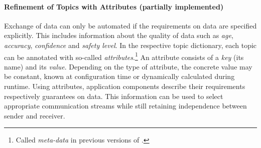\paragraph{Refinement of Topics with Attributes (partially implemented)}
Exchange of data can only be automated if the requirements on data are specified explicitly.
This includes information about the quality of data such as \emph{age}, \emph{accuracy}, \emph{confidence} and \emph{safety level}.
In the respective topic dictionary, each topic can be annotated with so-called \emph{attributes}.\footnote{Called \emph{meta-data} in previous versions of \xme.}
An attribute consists of a \emph{key} (its name) and its \emph{value}.
Depending on the type of attribute, the concrete value may be constant, known at configuration time or dynamically calculated during runtime.
%
Using attributes, application components describe their requirements respectively guarantees on data.
This information can be used to select appropriate communication streams while still retaining independence between sender and receiver.

